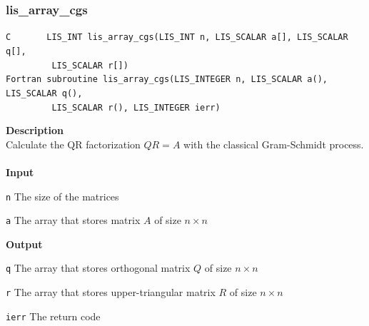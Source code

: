 \documentclass[a4paper]{article}
\newcommand{\namelistlabel}[1]{\mbox{#1}\hfill}
\newenvironment{namelist}[1]{%
\begin{list}{}
  {\let\makelabel\namelistlabel
  \settowidth{\labelwidth}{#1}
  \setlength{\leftmargin}{1.1\labelwidth}}
  }{%
\end{list}}
\begin{document}
\newpage
\subsubsection{lis\_array\_cgs}
\begin{screen}
\verb|C       LIS_INT lis_array_cgs(LIS_INT n, LIS_SCALAR a[], LIS_SCALAR q[],|\\
\verb|         LIS_SCALAR r[])|\\
\verb|Fortran subroutine lis_array_cgs(LIS_INTEGER n, LIS_SCALAR a(), LIS_SCALAR q(),|\\
\verb|         LIS_SCALAR r(), LIS_INTEGER ierr)|
\end{screen}
{\bf Description}\\
\indent
Calculate the QR factorization $QR=A$ with the classical Gram-Schmidt process.
\\ \\
\noindent
{\bf Input}
\begin{namelist}{XXXXXXXXXXXXXXXXXXXX}
\item[\tt n] The size of the matrices
\item[\tt a] The array that stores matrix $A$ of size $n \times n$
\end{namelist}
{\bf Output}
\begin{namelist}{XXXXXXXXXXXXXXXXXXXX}
\item[\tt q] The array that stores orthogonal matrix $Q$ of size $n \times n$
\item[\tt r] The array that stores upper-triangular matrix $R$ of size $n \times n$  
\item[\tt ierr] The return code
\end{namelist}
\end{document}
